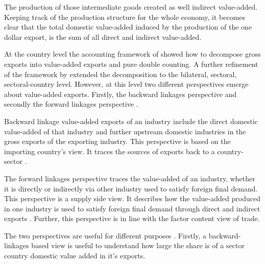 The production of those intermediate goods created as well indirect value-added.
Keeping track of the production structure for the whole economy, it becomes clear that
  the total domestic value-added induced by the production of the one dollar export, is the sum of all direct and indirect value-added.
     \par
  At the country level the accounting framework of \textcite{Koopman} showed how to decompose gross exports into value-added exports and pure double counting.
   A further refinement of the framework by \textcite{wang2013} extended the decomposition to the bilateral, sectoral, sectoral-country level.
However, at this level two different perspectives emerge about value-added exports.
   Firstly, the backward linkages perspective and secondly the forward linkages perspective \textcite{wang2013}. \par
 Backward linkage value-added exports of an industry include the direct domestic value-added of that industry and further upstream domestic industries in the gross exports of the exporting industry.
 This perspective is based on the importing country's view.
  It traces the sources of exports back to a country-sector \textcite{wang2013}. \par
  The forward linkages perspective  traces the value-added of an industry, whether it is directly or indirectly via other industry used to satisfy foreign final demand.
  This perspective is a supply side view.
  It describes how the value-added produced in one industry is used to satisfy foreign final demand through direct and indirect exports \textcite{wang2013}.
  Further, this perspective is in line with the factor content view of trade.
\par
The two perspectives are useful for different purposes \textcite{wang2013}.
Firstly, a backward-linkages based view is useful to understand how large the share is of a sector country   domestic value added in it's exports.
